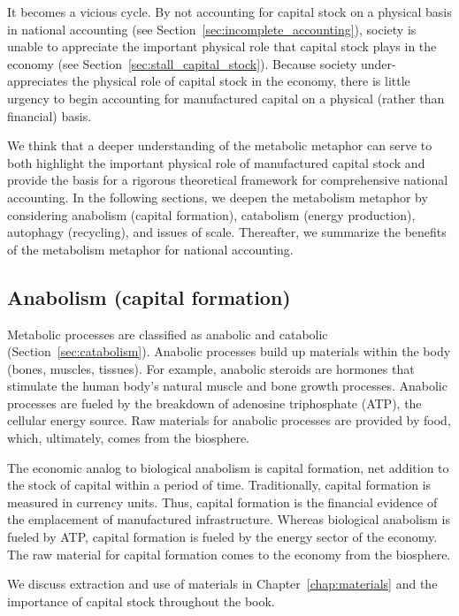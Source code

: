 It becomes a vicious cycle. 
By not accounting for capital stock on a physical basis 
in national accounting (see Section~\ref{sec:incomplete_accounting}), 
society is unable to appreciate 
the important physical role that capital stock plays in the economy
(see Section~\ref{sec:stall_capital_stock}).
Because society under-appreciates the physical role of capital stock in the economy, 
there is little urgency to begin accounting 
for manufactured capital on a physical (rather than financial) basis.

We think that a deeper understanding of the metabolic metaphor
can serve to both highlight the important physical role of manufactured capital stock and 
provide the basis for a rigorous theoretical framework 
for comprehensive national accounting.
In the following sections, 
we deepen the metabolism metaphor by considering 
anabolism (capital formation),
catabolism (energy production),
autophagy (recycling), and
issues of scale.
Thereafter, we summarize the benefits of the metabolism metaphor
for national accounting.

\subsection{Anabolism (capital formation)}
\label{sec:anabolism}

Metabolic processes are classified as anabolic and catabolic 
(Section~\ref{sec:catabolism}).
Anabolic processes build up materials within the body (bones, muscles, tissues).
For example, anabolic steroids are hormones that stimulate 
the human body's natural muscle and bone growth processes.
Anabolic processes are fueled by the breakdown 
of adenosine triphosphate (ATP), the cellular energy source.
Raw materials for anabolic processes are provided by food, 
which, ultimately, comes from the biosphere.

The economic analog to biological anabolism is capital formation, 
net addition to the stock of capital within a period of time.
Traditionally, capital formation is measured in currency units.
Thus, capital formation is the financial evidence 
of the emplacement of manufactured infrastructure.
Whereas biological anabolism is fueled by ATP, 
capital formation is fueled by the energy sector of the economy.
The raw material for capital formation comes to the 
economy from the biosphere.

We discuss extraction and use of materials in Chapter~\ref{chap:materials}
and the importance of capital stock throughout the book.


